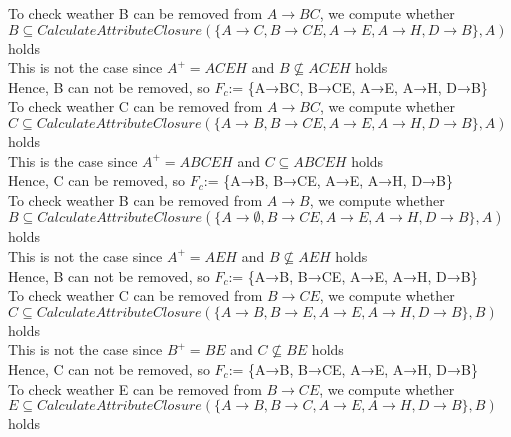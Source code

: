 \documentclass[]{article}
\begin{document}
	To check weather B can be removed from $A\rightarrow BC$, we compute whether $B\subseteq CalculateAttributeClosure(\{A\rightarrow C, B\rightarrow CE, A\rightarrow E, A\rightarrow H, D\rightarrow B\}, A)$ holds \\
	
	This is not the case since $A^{+} = ACEH$ and $B\not\subseteq ACEH$ holds  \\
	
	Hence, B can not be removed, so $F_{c}$:= \{A→BC, B→CE, A→E, A→H, D→B\} \\
	
	To check weather C can be removed from $A\rightarrow BC$, we compute whether $C\subseteq CalculateAttributeClosure(\{A\rightarrow B, B\rightarrow CE, A\rightarrow E, A\rightarrow H, D\rightarrow B\}, A)$ holds \\
	
	This is the case since $A^{+} = ABCEH$ and $C\subseteq ABCEH$ holds  \\
	
	Hence, C can be removed, so $F_{c}$:= \{A→B, B→CE, A→E, A→H, D→B\} \\
	
	To check weather B can be removed from $A\rightarrow B$, we compute whether $B\subseteq CalculateAttributeClosure(\{A\rightarrow \emptyset, B\rightarrow CE, A\rightarrow E, A\rightarrow H, D\rightarrow B\}, A)$ holds \\
	
	This is not the case since $A^{+} = AEH$ and $B\not\subseteq AEH$ holds  \\
	
	Hence, B can not be removed, so $F_{c}$:= \{A→B, B→CE, A→E, A→H, D→B\} \\
	
	To check weather C can be removed from $B\rightarrow CE$, we compute whether $C\subseteq CalculateAttributeClosure(\{A\rightarrow B, B\rightarrow E, A\rightarrow E, A\rightarrow H, D\rightarrow B\}, B)$ holds \\
	
	This is not the case since $B^{+} = BE$ and $C\not\subseteq BE$ holds  \\
	
	Hence, C can not be removed, so $F_{c}$:= \{A→B, B→CE, A→E, A→H, D→B\} \\
	
	To check weather E can be removed from $B\rightarrow CE$, we compute whether $E\subseteq CalculateAttributeClosure(\{A\rightarrow B, B\rightarrow C, A\rightarrow E, A\rightarrow H, D\rightarrow B\}, B)$ holds \\
	
\end{document}
